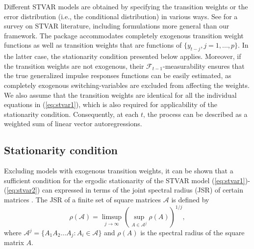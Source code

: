 \documentclass[nojss]{jss}
\begin{document}
Different STVAR models are obtained by specifying the transition weights or the error distribution (i.e., the conditional distribution) in various ways. See \cite{Hubrich+Terasvirta:2013} for a survey on STVAR literature, including formulations more general than our framework. The package  accommodates completely exogenous transition weight functions as well as transition weights that are functions of $\lbrace y_{t-j}, j=1,...,p \rbrace$. In the latter case, the stationarity condition presented below applies. Moreover, if the transition weights are not exogenous, their $\mathcal{F}_{t-1}$-measurability ensures that the true generalized impulse responses functions \citep{Koop+Pesaran+Potter:1996} can be easily estimated, as completely exogenous switching-variables are excluded from affecting the weights. We also assume that the transition weights are identical for all the individual equations in (\ref{eq:stvar1}), which is also required for applicability of the stationarity condition. Consequently, at each $t$‚ the process can be described as a weighted sum of linear vector autoregressions.


\subsection{Stationarity condition}\label{sec:stationarity}

Excluding models with exogenous transition weights, it can be shown that a sufficient condition for the ergodic stationarity of the STVAR model (\ref{eq:stvar1})-(\ref{eq:stvar2}) can expressed in terms of the joint spectral radius (JSR) of certain matrices \citep{Kheifets+Saikkonen:2020}. The JSR of a finite set of square matrices $\mathcal{A}$ is defined by
\begin{equation}
\rho(\mathcal{A}) = \underset{j\rightarrow \infty}{\limsup}\left(\underset{A\in \mathcal{A}^j}{\sup}\rho(A) \right)^{1/j},
\end{equation}
where $\mathcal{A}^j=\lbrace A_1A_2...A_j:A_i\in\mathcal{A}\rbrace$ and $\rho(A)$ is the spectral radius of the square matrix $A$.
\end{document}
